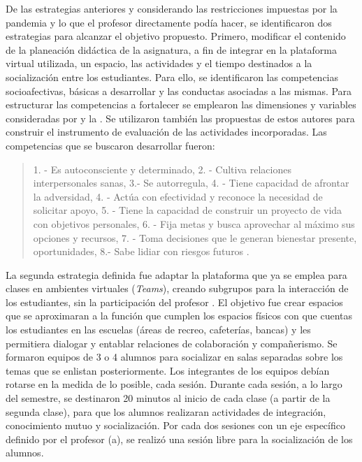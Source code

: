 \documentclass{textolivre}
\begin{document}
De las estrategias anteriores y considerando las restricciones impuestas por la pandemia y lo que el profesor directamente podía hacer, se identificaron dos estrategias para alcanzar el objetivo propuesto. Primero, modificar el contenido de la planeación didáctica de la asignatura, a fin de integrar en la plataforma virtual utilizada, un espacio, las actividades y el tiempo destinados a la socialización entre los estudiantes. Para ello, se identificaron las competencias socioafectivas, básicas a desarrollar \cite{mikulic2015} y las conductas asociadas a las mismas. Para estructurar las competencias a fortalecer se emplearon las dimensiones y variables consideradas por \textcite{mikulic2015} y la \textcite{secretaria2018}. Se utilizaron también las propuestas de estos autores para construir el instrumento de evaluación de las actividades incorporadas. Las competencias que se buscaron desarrollar fueron: 

\begin{quote}
1. - Es autoconsciente y determinado, 2. - Cultiva relaciones interpersonales sanas, 3.- Se autorregula, 4. - Tiene capacidad de afrontar la adversidad, 4. - Actúa con efectividad y reconoce la necesidad de solicitar apoyo, 5. - Tiene la capacidad de construir un proyecto de vida con objetivos personales, 6. - Fija metas y busca aprovechar al máximo sus opciones y recursos, 7. - Toma decisiones que le generan bienestar presente, oportunidades, 8.- Sabe lidiar con riesgos futuros \cite[p. 11]{secretaria2018}.
\end{quote}

La segunda estrategia definida fue adaptar la plataforma que ya se emplea para clases en ambientes virtuales (\emph{Teams}), creando subgrupos para la interacción de los estudiantes, sin la participación del profesor \cite{huertacuervo2020}. El objetivo fue crear espacios que se aproximaran a la función que cumplen los espacios físicos con que cuentas los estudiantes en las escuelas (áreas de recreo, cafeterías, bancas) y les permitiera dialogar y entablar relaciones de colaboración y compañerismo. Se formaron equipos de 3 o 4 alumnos para socializar en salas separadas sobre los temas que se enlistan posteriormente. Los integrantes de los equipos debían rotarse en la medida de lo posible, cada sesión. Durante cada sesión, a lo largo del semestre, se destinaron 20 minutos al inicio de cada clase (a partir de la segunda clase), para que los alumnos realizaran actividades de integración, conocimiento mutuo y socialización. Por cada dos sesiones con un eje específico definido por el profesor (a), se realizó una sesión libre para la socialización de los alumnos. 
\end{document}
